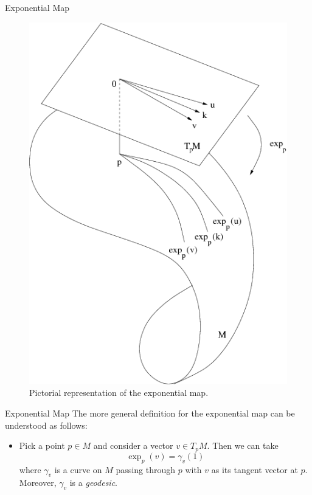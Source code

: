 \documentclass[usenames,dvipsnames]{beamer}
\theoremstyle{definition}
\theoremstyle{theorem}
\begin{document}
        \begin{frame}{Exponential Map}
        \begin{figure}
            \centering
            \includegraphics[scale=0.25]{Topological_Hydrodynamics/exponential_map.png}
            \caption{Pictorial representation of the exponential map.}
            \label{fig:my_label}
        \end{figure}
    \end{frame}
    
    \begin{frame}{Exponential Map}
        The more general definition for the exponential map can be understood as follows:
        \begin{itemize}
            \item Pick a point $p\in M$ and consider a vector $v\in T_pM$.  Then we can take
            \[
            \exp_p(v)=\gamma_v(1)
            \]
            where $\gamma_v$ is a curve on $M$ passing through $p$ with $v$ as its tangent vector at $p$. Moreover, $\gamma_v$ is a \emph{geodesic}. 
        \end{itemize}
    \end{frame}
    
\end{document}
